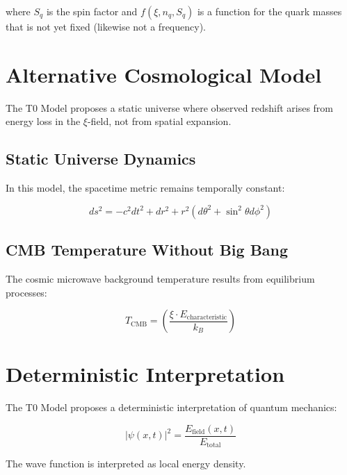 	where $S_q$ is the spin factor and $f(\xi, n_q, S_q)$ is a function for the quark masses that is not yet fixed (likewise not a frequency).
	
	

	
	\section{Alternative Cosmological Model}
	
	\begin{revolutionary}
		The T0 Model proposes a static universe where observed redshift arises from energy loss in the $\xi$-field, not from spatial expansion.
	\end{revolutionary}
	
	\subsection{Static Universe Dynamics}
	
	In this model, the spacetime metric remains temporally constant:
	
	\begin{equation}
		ds^2 = -c^2 dt^2 + dr^2 + r^2(d\theta^2 + \sin^2\theta d\phi^2)
	\end{equation}
	
	\subsection{CMB Temperature Without Big Bang}
	
	The cosmic microwave background temperature results from equilibrium processes:
	
	\begin{equation}
		T_{\text{CMB}} = \left(\frac{\xi \cdot E_{\text{characteristic}}}{k_B}\right)
	\end{equation}
	
	
	\section{Deterministic Interpretation}
	
	The T0 Model proposes a deterministic interpretation of quantum mechanics:
	
	\begin{equation}
		|\psi(x,t)|^2 = \frac{E_{\text{field}}(x,t)}{E_{\text{total}}}
	\end{equation}
	
	The wave function is interpreted as local energy density.
	
